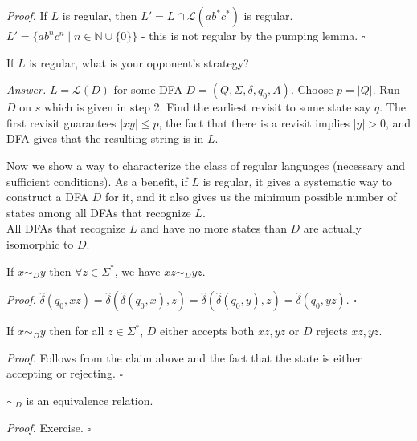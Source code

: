 \documentclass[a4paper]{article}
\newenvironment{proof}{\begin{breakbox}\textit{Proof.}}{\hfill$\square$\end{breakbox}}
\newenvironment{ans}{\begin{breakbox}\textit{Answer.}}{\end{breakbox}}
\newcommand{\nl}{\vspace{0.2cm}\\}
\newcommand{\mc}{\mathcal}
\renewcommand{\L}{\mc{L}}
\newcommand{\hd}{\hat{\delta}}
\begin{document}
\begin{proof}
    If $L$ is regular, then $L' = L \cap \L(ab^*c^*)$ is regular. $L' = \{ab^nc^n \mid n \in \mathbb{N} \cup \{0\}\}$ - this is not regular by the pumping lemma.
\end{proof}

\begin{ques}
    If $L$ is regular, what is your opponent's strategy?
\end{ques}

\begin{ans}
    $L = \L(D)$ for some DFA $D = (Q, \Sigma, \delta, q_0, A)$. Choose $p = |Q|$. Run $D$ on $s$ which is given in step 2. Find the earliest revisit to some state say $q$. The first revisit
    guarantees $|xy| \le p$, the fact that there is a revisit implies $|y| > 0$, and DFA gives that the resulting string is in $L$.
\end{ans}

Now we show a way to characterize the class of regular languages (necessary and sufficient conditions). As a benefit, if $L$ is regular, it gives a systematic way to construct a DFA $D$ for it,
and it also gives us the minimum possible number of states among all DFAs that recognize $L$.\nl
All DFAs that recognize $L$ and have no more states than $D$ are actually isomorphic to $D$.

\begin{claim}
    If $x \sim_D y$ then $\forall z \in \Sigma^*$, we have $xz \sim_D yz$.
\end{claim}

\begin{proof}
    $\hd(q_0, xz) = \hd(\hd(q_0, x), z) = \hd(\hd(q_0, y), z) = \hd(q_0, yz)$.
\end{proof}

\begin{claim}
    If $x \sim_D y$ then for all $z \in \Sigma^*$, $D$ either accepts both $xz, yz$ or $D$ rejects $xz, yz$.
\end{claim}

\begin{proof}
    Follows from the claim above and the fact that the state is either accepting or rejecting.
\end{proof}

\begin{claim}
    $\sim_D$ is an equivalence relation.
\end{claim}

\begin{proof}
    Exercise.
\end{proof}
\end{document}
